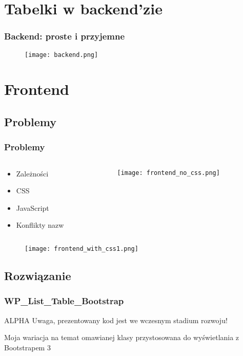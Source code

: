 \documentclass[a4paper, 16pt]{beamer}
\begin{document}
	\section{Tabelki w backend'zie}
		\begin{frame}
			\frametitle{Backend: proste i przyjemne}
			\begin{figure}
				\centering
				\texttt{[image: backend.png]}
			\end{figure}
		\end{frame}
	\section{Frontend}
		\subsection{Problemy}
			\begin{frame}
				\frametitle{Problemy}
				\begin{columns}
					\begin{column}{0.33\textwidth}
						\begin{itemize}
							\item{\color{red}Zależności}\pause
							\item{CSS}\pause
							\item{\color{red}JavaScript}\pause
							\item{Konflikty nazw}\pause
						\end{itemize}
					\end{column}
					\begin{column}{0.66\textwidth}
						\begin{figure}
							\texttt{[image: frontend\_no\_css.png]}
						\end{figure}
					\end{column}
				\end{columns}
				\pause
				\begin{figure}
				\centering
				\texttt{[image: frontend\_with\_css1.png]}
			\end{figure}
			\end{frame}
		\subsection{Rozwiązanie}
			\begin{frame}
				\frametitle{WP\_List\_Table\_Bootstrap}
				\begin{alertblock}{ALPHA}
					Uwaga, prezentowany kod jest we wczesnym stadium rozwoju!
				\end{alertblock}
				Moja wariacja na temat omawianej klasy przystosowana do wyświetlania z Bootstrapem 3
			\end{frame}
\end{document}
